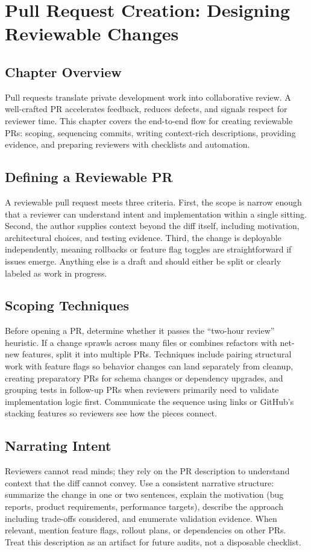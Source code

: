 \chapter{Pull Request Creation: Designing Reviewable Changes}

\section{Chapter Overview}
Pull requests translate private development work into collaborative review. A well-crafted PR accelerates feedback, reduces defects, and signals respect for reviewer time. This chapter covers the end-to-end flow for creating reviewable PRs: scoping, sequencing commits, writing context-rich descriptions, providing evidence, and preparing reviewers with checklists and automation.

\section{Defining a Reviewable PR}
A reviewable pull request meets three criteria. First, the scope is narrow enough that a reviewer can understand intent and implementation within a single sitting. Second, the author supplies context beyond the diff itself, including motivation, architectural choices, and testing evidence. Third, the change is deployable independently, meaning rollbacks or feature flag toggles are straightforward if issues emerge. Anything else is a draft and should either be split or clearly labeled as work in progress.

\section{Scoping Techniques}
Before opening a PR, determine whether it passes the ``two-hour review'' heuristic. If a change sprawls across many files or combines refactors with net-new features, split it into multiple PRs. Techniques include pairing structural work with feature flags so behavior changes can land separately from cleanup, creating preparatory PRs for schema changes or dependency upgrades, and grouping tests in follow-up PRs when reviewers primarily need to validate implementation logic first. Communicate the sequence using links or GitHub's stacking features so reviewers see how the pieces connect.

\section{Narrating Intent}
Reviewers cannot read minds; they rely on the PR description to understand context that the diff cannot convey. Use a consistent narrative structure: summarize the change in one or two sentences, explain the motivation (bug reports, product requirements, performance targets), describe the approach including trade-offs considered, and enumerate validation evidence. When relevant, mention feature flags, rollout plans, or dependencies on other PRs. Treat this description as an artifact for future audits, not a disposable checklist.

